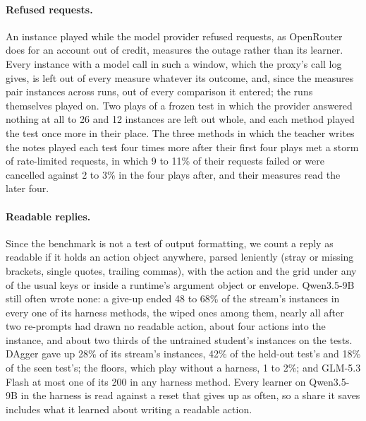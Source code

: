 \paragraph{Refused requests.} An instance played while the model provider refused requests, as OpenRouter does for an account out of credit, measures the outage rather than its learner. Every instance with a model call in such a window, which the proxy's call log gives, is left out of every measure whatever its outcome, and, since the measures pair instances across runs, out of every comparison it entered; the runs themselves played on. Two plays of a frozen test in which the provider answered nothing at all to 26 and 12 instances are left out whole, and each method played the test once more in their place. The three methods in which the teacher writes the notes played each test four times more after their first four plays met a storm of rate-limited requests, in which 9 to 11\% of their requests failed or were cancelled against 2 to 3\% in the four plays after, and their measures read the later four.

\paragraph{Readable replies.} Since the benchmark is not a test of output formatting, we count a reply as readable if it holds an action object anywhere, parsed leniently (stray or missing brackets, single quotes, trailing commas), with the action and the grid under any of the usual keys or inside a runtime's argument object or envelope. Qwen3.5-9B still often wrote none: a give-up ended 48 to 68\% of the stream's instances in every one of its harness methods, the wiped ones among them, nearly all after two re-prompts had drawn no readable action, about four actions into the instance, and about two thirds of the untrained student's instances on the tests. DAgger gave up 28\% of its stream's instances, 42\% of the held-out test's and 18\% of the seen test's; the floors, which play without a harness, 1 to 2\%; and GLM-5.3 Flash at most one of its 200 in any harness method. Every learner on Qwen3.5-9B in the harness is read against a reset that gives up as often, so a share it saves includes what it learned about writing a readable action.
